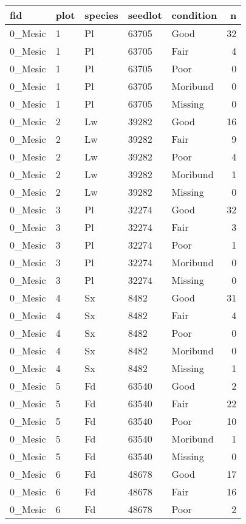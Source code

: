 \documentclass[
]{article}
\begin{document}
\begin{tabular}{l|l|l|l|l|r}
\hline
fid & plot & species & seedlot & condition & n\\
\hline
0\_Mesic & 1 & Pl & 63705 & Good & 32\\
\hline
0\_Mesic & 1 & Pl & 63705 & Fair & 4\\
\hline
0\_Mesic & 1 & Pl & 63705 & Poor & 0\\
\hline
0\_Mesic & 1 & Pl & 63705 & Moribund & 0\\
\hline
0\_Mesic & 1 & Pl & 63705 & Missing & 0\\
\hline
0\_Mesic & 2 & Lw & 39282 & Good & 16\\
\hline
0\_Mesic & 2 & Lw & 39282 & Fair & 9\\
\hline
0\_Mesic & 2 & Lw & 39282 & Poor & 4\\
\hline
0\_Mesic & 2 & Lw & 39282 & Moribund & 1\\
\hline
0\_Mesic & 2 & Lw & 39282 & Missing & 0\\
\hline
0\_Mesic & 3 & Pl & 32274 & Good & 32\\
\hline
0\_Mesic & 3 & Pl & 32274 & Fair & 3\\
\hline
0\_Mesic & 3 & Pl & 32274 & Poor & 1\\
\hline
0\_Mesic & 3 & Pl & 32274 & Moribund & 0\\
\hline
0\_Mesic & 3 & Pl & 32274 & Missing & 0\\
\hline
0\_Mesic & 4 & Sx & 8482 & Good & 31\\
\hline
0\_Mesic & 4 & Sx & 8482 & Fair & 4\\
\hline
0\_Mesic & 4 & Sx & 8482 & Poor & 0\\
\hline
0\_Mesic & 4 & Sx & 8482 & Moribund & 0\\
\hline
0\_Mesic & 4 & Sx & 8482 & Missing & 1\\
\hline
0\_Mesic & 5 & Fd & 63540 & Good & 2\\
\hline
0\_Mesic & 5 & Fd & 63540 & Fair & 22\\
\hline
0\_Mesic & 5 & Fd & 63540 & Poor & 10\\
\hline
0\_Mesic & 5 & Fd & 63540 & Moribund & 1\\
\hline
0\_Mesic & 5 & Fd & 63540 & Missing & 0\\
\hline
0\_Mesic & 6 & Fd & 48678 & Good & 17\\
\hline
0\_Mesic & 6 & Fd & 48678 & Fair & 16\\
\hline
0\_Mesic & 6 & Fd & 48678 & Poor & 2\\

\end{tabular}
\end{document}
